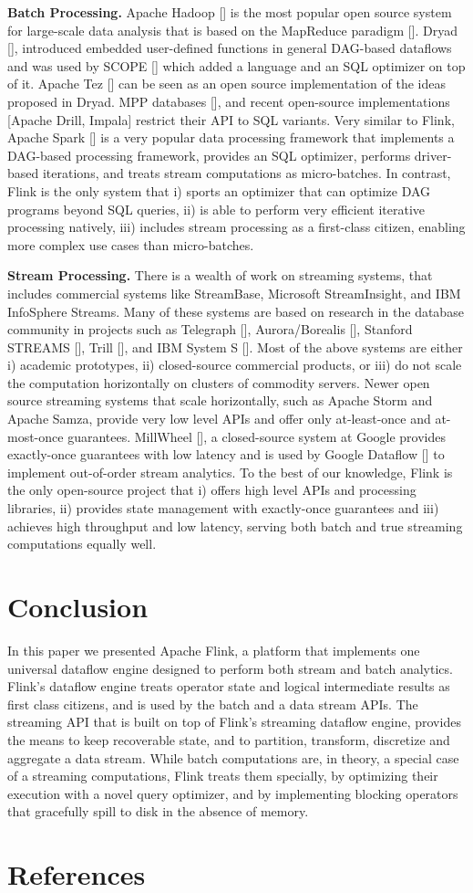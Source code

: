 \documentclass{sig-alternate}
\begin{document}
\textbf{Batch Processing.} Apache Hadoop [] is the most popular open source system for large-scale data analysis that is based on the MapReduce paradigm []. Dryad [], introduced embedded user-defined functions in general DAG-based dataflows and was used by SCOPE [] which added a language and an SQL optimizer on top of it. Apache Tez [] can be seen as an open source implementation of the ideas proposed in Dryad. MPP databases [], and recent open-source implementations [Apache Drill, Impala] restrict their API to SQL variants. Very similar to Flink, Apache Spark [] is a very popular data processing framework that implements a DAG-based processing framework, provides an SQL optimizer, performs driver-based iterations, and treats stream computations as micro-batches. In contrast, Flink is the only system that i) sports an optimizer that can optimize DAG programs beyond SQL queries, ii) is able to perform very efficient iterative processing natively, iii)  includes stream processing as a first-class citizen, enabling more complex use cases than micro-batches.

\textbf{Stream Processing.} There is a wealth of work on streaming systems, that includes commercial systems like StreamBase, Microsoft StreamInsight, and IBM InfoSphere Streams. Many of these systems are based on research in the database community in projects such as Telegraph [], Aurora/Borealis [], Stanford STREAMS [], Trill [], and IBM System S []. Most of the above systems are either i) academic prototypes, ii) closed-source commercial products, or iii) do not scale the computation horizontally on clusters of commodity servers. Newer open source streaming systems that scale horizontally, such as Apache Storm and Apache Samza, provide very low level APIs and offer only at-least-once and at-most-once guarantees. MillWheel [], a closed-source system at Google provides exactly-once guarantees with low latency and is used by Google Dataflow [] to implement  out-of-order stream analytics. To the best of our knowledge, Flink is the only open-source project that i) offers high level APIs and processing libraries, ii) provides state management with exactly-once guarantees and iii) achieves high throughput and low latency, serving both batch and true streaming computations equally well.

\section{Conclusion}

In this paper we presented Apache Flink, a platform that implements one universal dataflow engine designed to perform both stream and batch analytics. Flink's dataflow engine treats operator state and logical intermediate results as first class citizens, and is used by the batch and a data stream APIs. The streaming API that is built on top of  Flink's streaming dataflow engine, provides the means to keep recoverable state, and to partition, transform, discretize and aggregate a data stream. While batch computations are, in theory, a special case of a streaming computations, Flink treats them specially, by optimizing their execution with a novel query optimizer, and by implementing blocking operators that gracefully spill to disk in the absence of memory. 

\section{References}



\end{document}
